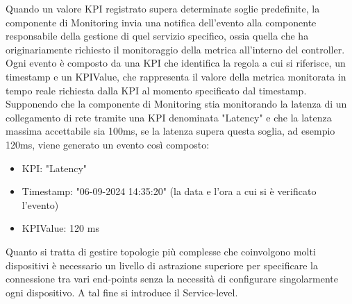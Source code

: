Quando un valore KPI registrato supera determinate soglie predefinite, la componente di Monitoring invia una notifica dell'evento 
alla componente responsabile della gestione di quel servizio specifico, ossia quella che ha
originariamente richiesto il monitoraggio della metrica all'interno del controller.
\\Ogni evento è composto da una KPI che identifica la regola a cui si riferisce, un timestamp e un KPIValue, che rappresenta il valore della metrica monitorata in tempo reale richiesta dalla KPI al momento specificato dal timestamp.
Supponendo che la componente di Monitoring stia monitorando la latenza di un collegamento di rete tramite una KPI denominata "Latency" e che la latenza massima accettabile sia 100ms,
se la latenza supera questa soglia, ad esempio 120ms, viene generato un evento così composto: 
\begin{itemize}
    \item KPI: "Latency"
    \item Timestamp: "06-09-2024 14:35:20" (la data e l'ora a cui si è verificato l'evento)
    \item KPIValue: 120 ms
\end{itemize}
Quanto si tratta di gestire topologie più complesse che coinvolgono molti dispositivi è necessario un livello di astrazione superiore per specificare la connessione tra vari end-points
senza la necessità di configurare singolarmente ogni dispositivo. 
A tal fine si introduce il Service-level. 

